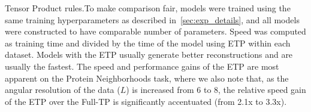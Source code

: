 \begin{table}[ht]
{    Tensor Product rules.}{To make comparison fair, models were trained using the same training hyperparameters as
    described in~\ref{sec:exp_details}, and all models were constructed to have comparable number
    of parameters. Speed was computed as training time and divided by the time of the model using
    ETP within each dataset. Models with the ETP usually generate better
    reconstructions and are usually the fastest. The speed and performance gains of the ETP are
    most apparent on the Protein Neighborhoods task, where we also note that, as the angular
    resolution of the data ($L$) is increased from 6 to 8, the relative speed gain of the ETP over
    the Full-TP is significantly accentuated (from 2.1x to 3.3x).}
\label{table:tp_ablation}
\end{table}


\begin{table}[ht]
\begin{center}
\end{center}
\end{table}
